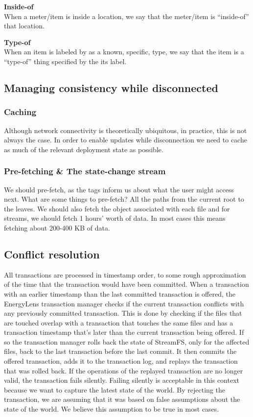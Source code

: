 {\bf Inside-of}\\
When a meter/item is inside a location, we say that the meter/item is “inside-of” that location.

{\bf Type-of}\\
When an item is labeled by as a known, specific, type, we say that the item is a “type-of” thing specified by the its label.

\subsection{Managing consistency while disconnected}

\subsubsection{Caching}
Although network connectivity is theoretically ubiquitous, in practice, this is not always the case.  In order to enable updates while disconnection we need to cache as much of the relevant deployment state as possible.

\subsubsection{Pre-fetching \& The state-change stream}
We should pre-fetch, as the tags inform us about what the user might access next.  What are some things to pre-fetch?  All the paths from the current root to the leaves.  We should also fetch the object associated with each file and for streams, we should fetch 1 hours’ worth of data.  In most cases this means fetching about 200-400 KB of data.

\subsection{Conflict resolution}
All transactions are processed in timestamp order, to some rough approximation of the time that the transaction would have been committed.  When a transaction with an earlier timestamp than the last committed transaction is offered, the EnergyLens transaction manager checks if the current transaction conflicts with any previously committed transaction.  This is done by checking if the files that are touched overlap with a transaction that touches the same files and has a transaction timestamp that’s later than the current transaction being offered.  If so the transaction manager rolls back the state of StreamFS, only for the affected files, back to the last transaction before the last commit.  It then commits the offered transaction, adds it to the transaction log, and replays the transaction that was rolled back.  If the operations of the replayed transaction are no longer valid, the transaction fails silently.  Failing silently is acceptable in this context because we want to capture the latest state of the world.  By rejecting the transaction, we are assuming that it was based on false assumptions about the state of the world.  We believe this assumption to be true in most cases.